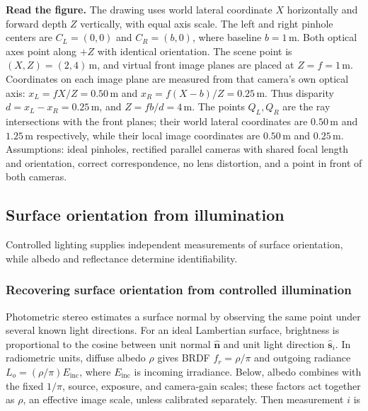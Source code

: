 \textbf{Read the figure.} The drawing uses world lateral coordinate \(X\) horizontally and forward depth \(Z\) vertically, with equal axis scale. The left and right pinhole centers are \(C_L=(0,0)\) and \(C_R=(b,0)\), where baseline \(b=1\,\mathrm{m}\). Both optical axes point along \(+Z\) with identical orientation. The scene point is \((X,Z)=(2,4)\,\mathrm{m}\), and virtual front image planes are placed at \(Z=f=1\,\mathrm{m}\). Coordinates on each image plane are measured from that camera's own optical axis: \(x_L=fX/Z=0.50\,\mathrm{m}\) and \(x_R=f(X-b)/Z=0.25\,\mathrm{m}\). Thus disparity \(d=x_L-x_R=0.25\,\mathrm{m}\), and \(Z=fb/d=4\,\mathrm{m}\). The points \(Q_L,Q_R\) are the ray intersections with the front planes; their world lateral coordinates are \(0.50\,\mathrm{m}\) and \(1.25\,\mathrm{m}\) respectively, while their local image coordinates are \(0.50\,\mathrm{m}\) and \(0.25\,\mathrm{m}\). Assumptions: ideal pinholes, rectified parallel cameras with shared focal length and orientation, correct correspondence, no lens distortion, and a point in front of both cameras.

\subsection{Surface orientation from illumination}\label{surface-orientation-from-illumination}

Controlled lighting supplies independent measurements of surface orientation, while albedo and reflectance determine identifiability.

\subsubsection{Recovering surface orientation from controlled illumination}\label{recovering-surface-orientation-from-controlled-illumination}

Photometric stereo estimates a surface normal by observing the same point under several known light directions. For an ideal Lambertian surface, brightness is proportional to the cosine between unit normal \(\hat{\mathbf{n}}\) and unit light direction \(\hat{\mathbf{s}}_i\). In radiometric units, diffuse albedo \(\rho\) gives BRDF \(f_r=\rho/\pi\) and outgoing radiance \(L_o=(\rho/\pi)E_{\mathrm{inc}}\), where \(E_{\mathrm{inc}}\) is incoming irradiance. Below, albedo combines with the fixed \(1/\pi\), source, exposure, and camera-gain scales; these factors act together as \(\rho\), an effective image scale, unless calibrated separately. Then measurement \(i\) is

